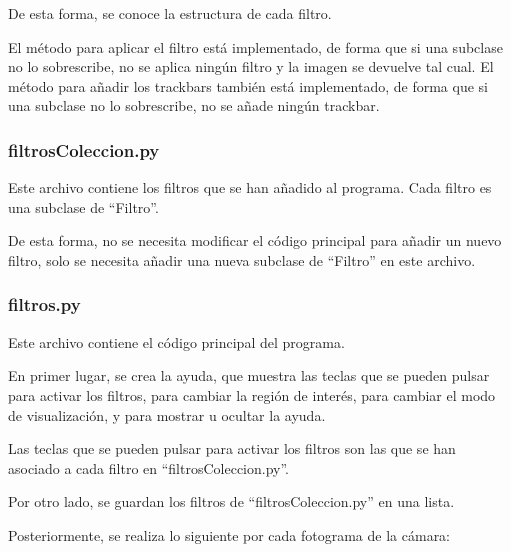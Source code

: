 \documentclass[12pt]{article}
\begin{document}
De esta forma, se conoce la estructura de cada filtro. 

El método para aplicar el filtro está implementado, de forma que si una subclase no lo sobrescribe, no se aplica ningún filtro y la imagen se devuelve tal cual. El método para añadir los trackbars también está implementado, de forma que si una subclase no lo sobrescribe, no se añade ningún trackbar.

\subsubsection*{filtrosColeccion.py}
Este archivo contiene los filtros que se han añadido al programa. Cada filtro es una subclase de ``Filtro''.

De esta forma, no se necesita modificar el código principal para añadir un nuevo filtro, solo se necesita añadir una nueva subclase de ``Filtro'' en este archivo.

\subsubsection*{filtros.py}
Este archivo contiene el código principal del programa.

En primer lugar, se crea la ayuda, que muestra las teclas que se pueden pulsar para activar los filtros, para cambiar la región de interés, para cambiar el modo de visualización, y para mostrar u ocultar la ayuda.

Las teclas que se pueden pulsar para activar los filtros son las que se han asociado a cada filtro en ``filtrosColeccion.py''. 

Por otro lado, se guardan los filtros de ``filtrosColeccion.py'' en una lista.

Posteriormente, se realiza lo siguiente por cada fotograma de la cámara:
\end{document}
